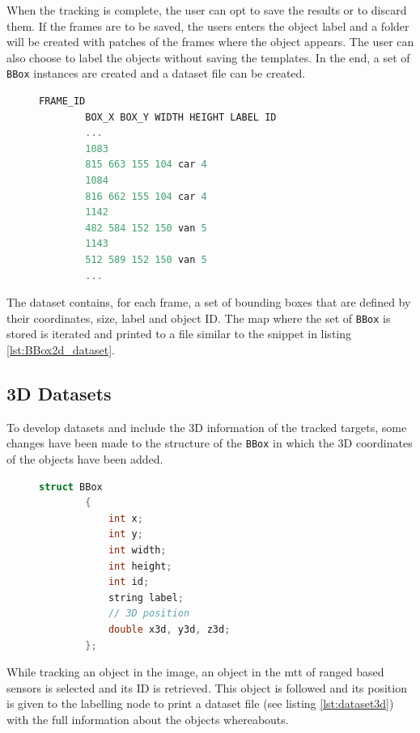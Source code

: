 When the tracking is complete, the user can opt to save the results or to discard them. If the frames are to be saved, the users enters the object label and a folder will be created with patches of the frames where the object appears. The user can also choose to label the objects without saving the templates. In the end, a set of \texttt{BBox} instances are created and a dataset file can be created.

\begin{figure}
	\begin{center}
		\begin{lstlisting}[label={lst:BBox2d_dataset}, caption={2D dataset example snippet},language=c++]
		FRAME_ID 
		BOX_X BOX_Y WIDTH HEIGHT LABEL ID
		...
		1083
		815 663 155 104 car 4
		1084
		816 662 155 104 car 4
		1142
		482 584 152 150 van 5
		1143
		512 589 152 150 van 5
		...\end{lstlisting}
	\end{center}
\end{figure}

The dataset contains, for each frame, a set of bounding boxes that are defined by their coordinates, size, label and object ID. The map where the set of \texttt{BBox} is stored is iterated and printed to a file similar to the snippet in listing \ref{lst:BBox2d_dataset}.


\subsection{3D Datasets}

To develop datasets and include the 3D information of the tracked targets, some changes have been made to the structure of the \texttt{BBox} in which the 3D coordinates of the objects have been added.

\begin{figure}
	\begin{center}
		\begin{lstlisting}[label={lst:bbox3d}, caption={BBox struct definition with 3D capabilities},language=c++]
		struct BBox
		{
			int x;
			int y;
			int width;
			int height;
			int id;
			string label;
			// 3D position
			double x3d, y3d, z3d;
		};		\end{lstlisting}
	\end{center}
\end{figure}

While tracking an object in the image, an object in the \gls{mtt} of ranged based sensors is selected and its ID is retrieved. This object is followed and its position is given to the labelling node to print a dataset file (see listing \ref{lst:dataset3d}) with the full information about the objects whereabouts.

